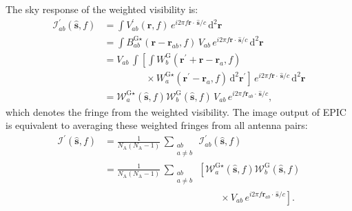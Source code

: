 \documentclass[a4paper,fleqn,usenatbib]{mnras}
\newcommand{\Nant}{N_\textrm{A}}
\newcommand{\dif}{\mathrm{d}}
\begin{document}
The sky response of the weighted visibility is:
\begin{align}
  \mathcal{I}^\prime_{ab}(\hat{\mathbf{s}},f) &= \int V^\prime_{ab}(\mathbf{r},f)\,e^{i 2\pi f\mathbf{r}\cdot\,\hat{\mathbf{s}}/c}\,\dif^2\mathbf{r} \nonumber\\
                                              &= \int B^{\textrm{G}\star}_{ab}(\mathbf{r}-\mathbf{r}_{ab},f)\,V_{ab}\,e^{i 2\pi f\mathbf{r}\cdot\,\hat{\mathbf{s}}/c}\,\dif^2\mathbf{r} \nonumber\\
                                              &= V_{ab}\,\int \left[\int W^\textrm{G}_b(\mathbf{r}^\prime+\mathbf{r}-\mathbf{r}_a,f)\right. \nonumber\\
                                              &\qquad\qquad\,\,\, \left.\times\, W^{\textrm{G}\star}_a(\mathbf{r}^\prime-\mathbf{r}_a,f)\,\dif^2\mathbf{r}^\prime\right]\,e^{i 2\pi f\mathbf{r}\cdot\,\hat{\mathbf{s}}/c}\,\dif^2\mathbf{r} \nonumber\\
                                              &= \mathcal{W}^{\textrm{G}\star}_a(\hat{\mathbf{s}},f)\mathcal{W}^\textrm{G}_b(\hat{\mathbf{s}},f)\,V_{ab}\,e^{i 2\pi f\mathbf{r}_{ab}\!\cdot\,\hat{\mathbf{s}}/c},
\end{align}
which denotes the fringe from the weighted visibility. The image output of EPIC is equivalent to averaging these weighted fringes from all antenna pairs:
\begin{align}\label{eqn:apndx-wt-dirty-image-EPIC}
  \mathcal{I}^\prime(\hat{\mathbf{s}},f) &= \frac{1}{\Nant(\Nant-1)}\,\sum_{\substack{ab\\a\ne b}}\,\mathcal{I}^\prime_{ab}(\hat{\mathbf{s}},f) \nonumber\\
                                         &= \frac{1}{\Nant(\Nant-1)}\,\sum_{\substack{ab\\a\ne b}}\,\left[\mathcal{W}^{\textrm{G}\star}_a(\hat{\mathbf{s}},f)\mathcal{W}^\textrm{G}_b(\hat{\mathbf{s}},f)\right. \nonumber\\
  &\qquad\qquad\qquad\qquad\qquad\qquad \times \left. V_{ab}\,e^{i 2\pi f\mathbf{r}_{ab}\!\cdot\,\hat{\mathbf{s}}/c}\right].
\end{align}
\end{document}
